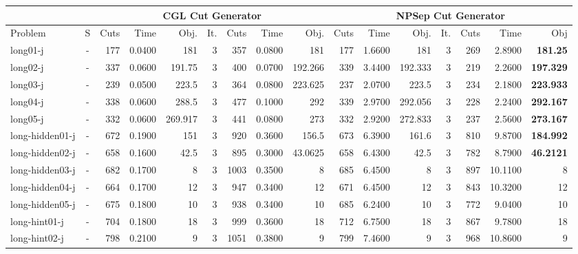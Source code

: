 \documentclass[a4paper]{article}
\begin{document}
\begin{sidewaystable}[h]\small 
\begin{tabular}{l|r|r|r|r|r|r|r|r|r|r|r|r|r|r|r}
\hline
        \multicolumn{2}{c|}{}   & \multicolumn{7}{c|}{CGL Cut Generator} & \multicolumn{7}{c}{NPSep Cut Generator} \\
\hline
Problem & S & Cuts & Time & Obj. & It. & Cuts & Time	& Obj. & Cuts & Time & Obj. & It. & Cuts & Time & Obj \\
\hline
\hline
long01-j & \multicolumn{1}{c|}{ - } & 177 & 0.0400 & 181 & 3 & 357 & 0.0800 & 181 & 177 & 1.6600 & 181 & 3 & 269 & 2.8900 & \textbf{181.25} \\
long02-j & \multicolumn{1}{c|}{ - } & 337 & 0.0600 & 191.75 & 3 & 400 & 0.0700 & 192.266 & 339 & 3.4400 & 192.333 & 3 & 219 & 2.2600 & \textbf{197.329} \\
long03-j & \multicolumn{1}{c|}{ - } & 239 & 0.0500 & 223.5 & 3 & 364 & 0.0800 & 223.625 & 237 & 2.0700 & 223.5 & 3 & 234 & 2.1800 & \textbf{223.933} \\
long04-j & \multicolumn{1}{c|}{ - } & 338 & 0.0600 & 288.5 & 3 & 477 & 0.1000 & 292 & 339 & 2.9700 & 292.056 & 3 & 228 & 2.2400 & \textbf{292.167} \\
long05-j & \multicolumn{1}{c|}{ - } & 332 & 0.0600 & 269.917 & 3 & 441 & 0.0800 & 273 & 332 & 2.9200 & 272.833 & 3 & 237 & 2.5600 & \textbf{273.167} \\
long-hidden01-j & \multicolumn{1}{c|}{ - } & 672 & 0.1900 & 151 & 3 & 920 & 0.3600 & 156.5 & 673 & 6.3900 & 161.6 & 3 & 810 & 9.8700 & \textbf{184.992} \\
long-hidden02-j & \multicolumn{1}{c|}{ - } & 658 & 0.1600 & 42.5 & 3 & 895 & 0.3000 & 43.0625 & 658 & 6.4300 & 42.5 & 3 & 782 & 8.7900 & \textbf{46.2121} \\
long-hidden03-j & \multicolumn{1}{c|}{ - } & 682 & 0.1700 & 8 & 3 & 1003 & 0.3500 & 8 & 685 & 6.4500 & 8 & 3 & 897 & 10.1100 & 8 \\
long-hidden04-j & \multicolumn{1}{c|}{ - } & 664 & 0.1700 & 12 & 3 & 947 & 0.3400 & 12 & 671 & 6.4500 & 12 & 3 & 843 & 10.3200 & 12 \\
long-hidden05-j & \multicolumn{1}{c|}{ - } & 675 & 0.1800 & 10 & 3 & 938 & 0.3400 & 10 & 685 & 6.2400 & 10 & 3 & 772 & 9.0400 & 10 \\
long-hint01-j & \multicolumn{1}{c|}{ - } & 704 & 0.1800 & 18 & 3 & 999 & 0.3600 & 18 & 712 & 6.7500 & 18 & 3 & 867 & 9.7800 & 18 \\
long-hint02-j & \multicolumn{1}{c|}{ - } & 798 & 0.2100 & 9 & 3 & 1051 & 0.3800 & 9 & 799 & 7.4600 & 9 & 3 & 968 & 10.8600 & 9 \\

\end{tabular}
\end{sidewaystable}
\end{document}
